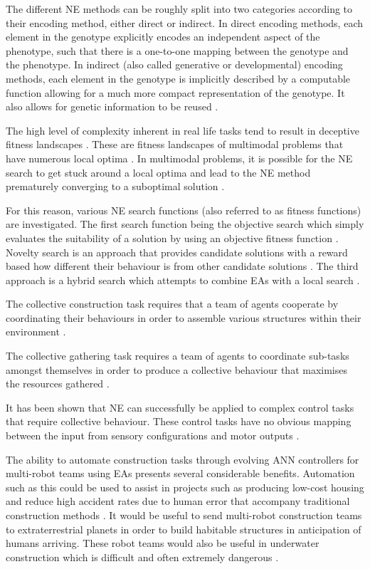 \documentclass[conference]{IEEEtran}
\begin{document}
The different NE methods can be roughly split into two categories according to their encoding method, either direct or indirect. In direct encoding methods, each element in the genotype explicitly encodes an independent aspect of the phenotype, such that there is a one-to-one mapping between the genotype and the phenotype. In indirect (also called generative or developmental) encoding methods, each element in the genotype is implicitly described by a computable function allowing for a much more compact representation of the genotype. It also allows for genetic information to be reused \cite{clune2011performance,Stanley2003}.

The high level of complexity inherent in real life tasks tend to result in deceptive fitness landscapes \cite{RefWorks:11}. These are fitness landscapes of multimodal problems that have numerous local optima \cite{RefWorks:33}. In multimodal problems, it is possible for the NE search to get stuck around a local optima and lead to the NE method prematurely converging to a suboptimal solution \cite{RefWorks:11}.

For this reason, various NE search functions (also referred to as fitness functions) are investigated. The first search function being the objective search which simply evaluates the suitability of a solution by using an objective fitness function \cite{lehman2011abandoning}.
Novelty search is an approach that provides candidate solutions with a reward based how different their behaviour is from other candidate solutions \cite{RefWorks:11}. The third approach is a hybrid search which attempts to combine EAs with a local search \cite{Castillo2007}.

The collective construction task requires that a team of agents cooperate by coordinating their behaviours in order to assemble various structures within their environment \cite{RefWorks:15}.

The collective gathering task requires a team of agents to coordinate sub-tasks amongst themselves in order to produce a collective behaviour that maximises the resources gathered \cite{RefWorks:15}.

It has been shown that NE can successfully be applied to complex control tasks that require collective behaviour. These control tasks have no obvious mapping between the input from sensory configurations and motor outputs \cite{RefWorks:15}.

The ability to automate construction tasks through evolving ANN controllers for multi-robot teams using EAs presents several considerable benefits. Automation such as this could be used to assist in projects such as producing low-cost housing and reduce high accident rates due to human error that accompany traditional construction methods \cite{Khoshnevis2003}. It would be useful to send multi-robot construction teams to extraterrestrial planets in order to build habitable structures in anticipation of humans arriving. These robot teams would also be useful in underwater construction which is difficult and often extremely dangerous \cite{RefWorks:30}.
\end{document}
